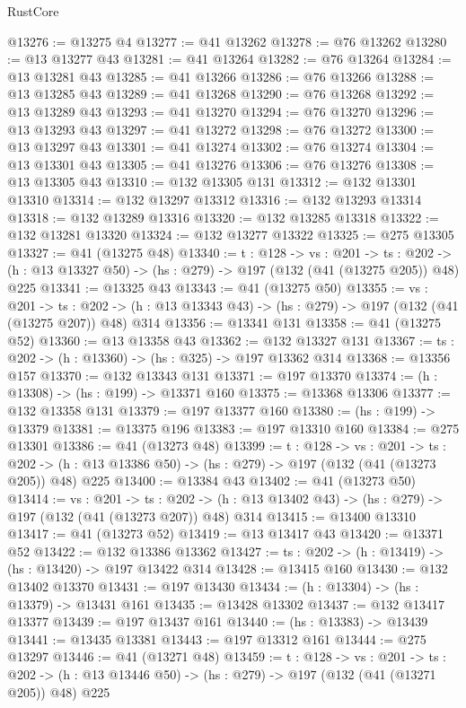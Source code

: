 \begin{lexlean}{RustCore}
\begin{coremodule}
@13276 := @13275 @4
@13277 := @41 @13262
@13278 := @76 @13262
@13280 := @13 @13277 @43
@13281 := @41 @13264
@13282 := @76 @13264
@13284 := @13 @13281 @43
@13285 := @41 @13266
@13286 := @76 @13266
@13288 := @13 @13285 @43
@13289 := @41 @13268
@13290 := @76 @13268
@13292 := @13 @13289 @43
@13293 := @41 @13270
@13294 := @76 @13270
@13296 := @13 @13293 @43
@13297 := @41 @13272
@13298 := @76 @13272
@13300 := @13 @13297 @43
@13301 := @41 @13274
@13302 := @76 @13274
@13304 := @13 @13301 @43
@13305 := @41 @13276
@13306 := @76 @13276
@13308 := @13 @13305 @43
@13310 := @132 @13305 @131
@13312 := @132 @13301 @13310
@13314 := @132 @13297 @13312
@13316 := @132 @13293 @13314
@13318 := @132 @13289 @13316
@13320 := @132 @13285 @13318
@13322 := @132 @13281 @13320
@13324 := @132 @13277 @13322
@13325 := @275 @13305
@13327 := @41 (@13275 @48)
@13340 := {t : @128} ->
  {vs : @201} ->
  {ts : @202} -> (h : @13 @13327 @50) -> (hs : @279) -> @197 (@132 (@41 (@13275 @205)) @48) @225
@13341 := @13325 @43
@13343 := @41 (@13275 @50)
@13355 := {vs : @201} ->
  {ts : @202} -> (h : @13 @13343 @43) -> (hs : @279) -> @197 (@132 (@41 (@13275 @207)) @48) @314
@13356 := @13341 @131
@13358 := @41 (@13275 @52)
@13360 := @13 @13358 @43
@13362 := @132 @13327 @131
@13367 := {ts : @202} -> (h : @13360) -> (hs : @325) -> @197 @13362 @314
@13368 := @13356 @157
@13370 := @132 @13343 @131
@13371 := @197 @13370
@13374 := (h : @13308) -> (hs : @199) -> @13371 @160
@13375 := @13368 @13306
@13377 := @132 @13358 @131
@13379 := @197 @13377 @160
@13380 := (hs : @199) -> @13379
@13381 := @13375 @196
@13383 := @197 @13310 @160
@13384 := @275 @13301
@13386 := @41 (@13273 @48)
@13399 := {t : @128} ->
  {vs : @201} ->
  {ts : @202} -> (h : @13 @13386 @50) -> (hs : @279) -> @197 (@132 (@41 (@13273 @205)) @48) @225
@13400 := @13384 @43
@13402 := @41 (@13273 @50)
@13414 := {vs : @201} ->
  {ts : @202} -> (h : @13 @13402 @43) -> (hs : @279) -> @197 (@132 (@41 (@13273 @207)) @48) @314
@13415 := @13400 @13310
@13417 := @41 (@13273 @52)
@13419 := @13 @13417 @43
@13420 := @13371 @52
@13422 := @132 @13386 @13362
@13427 := {ts : @202} -> (h : @13419) -> (hs : @13420) -> @197 @13422 @314
@13428 := @13415 @160
@13430 := @132 @13402 @13370
@13431 := @197 @13430
@13434 := (h : @13304) -> (hs : @13379) -> @13431 @161
@13435 := @13428 @13302
@13437 := @132 @13417 @13377
@13439 := @197 @13437 @161
@13440 := (hs : @13383) -> @13439
@13441 := @13435 @13381
@13443 := @197 @13312 @161
@13444 := @275 @13297
@13446 := @41 (@13271 @48)
@13459 := {t : @128} ->
  {vs : @201} ->
  {ts : @202} -> (h : @13 @13446 @50) -> (hs : @279) -> @197 (@132 (@41 (@13271 @205)) @48) @225

\end{coremodule}
\end{lexlean}
